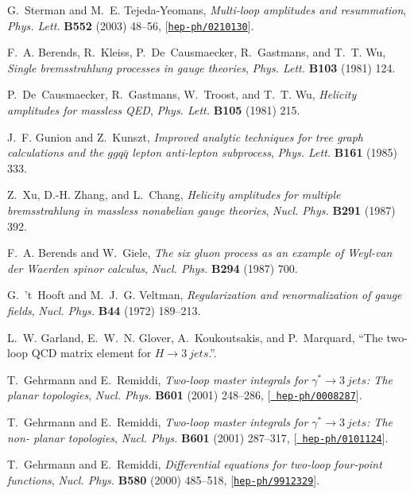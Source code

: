 \documentclass[paper,notoc,nohyper]{JHEP3}
\begin{document}
\begin{thebibliography}{10}
G.~Sterman and M.~E. Tejeda-Yeomans, {\it Multi-loop amplitudes and
  resummation},  {\em Phys. Lett.} {\bf B552} (2003) 48--56,
  [\href{http://xxx.lanl.gov/abs/hep-ph/0210130}{{\tt hep-ph/0210130}}].

F.~A. Berends, R.~Kleiss, P.~De~Causmaecker, R.~Gastmans, and T.~T. Wu, {\it
  Single bremsstrahlung processes in gauge theories},  {\em Phys. Lett.} {\bf
  B103} (1981) 124.

P.~De~Causmaecker, R.~Gastmans, W.~Troost, and T.~T. Wu, {\it Helicity
  amplitudes for massless {QED}},  {\em Phys. Lett.} {\bf B105} (1981) 215.

J.~F. Gunion and Z.~Kunszt, {\it Improved analytic techniques for tree graph
  calculations and the $g g q\bar{q}$ lepton anti-lepton subprocess},  {\em
  Phys. Lett.} {\bf B161} (1985) 333.

Z.~Xu, D.-H. Zhang, and L.~Chang, {\it Helicity amplitudes for multiple
  bremsstrahlung in massless nonabelian gauge theories},  {\em Nucl. Phys.}
  {\bf B291} (1987) 392.

F.~A. Berends and W.~Giele, {\it The six gluon process as an example of
  {W}eyl-van der {W}aerden spinor calculus},  {\em Nucl. Phys.} {\bf B294}
  (1987) 700.

G.~'t~Hooft and M.~J.~G. Veltman, {\it Regularization and renormalization of
  gauge fields},  {\em Nucl. Phys.} {\bf B44} (1972) 189--213.

L.~W. Garland, E.~W.~N. Glover, A.~Koukoutsakis, and P.~Marquard, ``The
  two-loop {QCD} matrix element for ${H} \rightarrow 3~jets$.''.

T.~Gehrmann and E.~Remiddi, {\it Two-loop master integrals for $\gamma^*
  \rightarrow 3 ~jets$: The planar topologies},  {\em Nucl. Phys.} {\bf B601}
  (2001) 248--286, [\href{http://xxx.lanl.gov/abs/hep-ph/0008287}{{\tt
  hep-ph/0008287}}].

T.~Gehrmann and E.~Remiddi, {\it Two-loop master integrals for $\gamma^*
  \rightarrow 3 ~jets$: The non- planar topologies},  {\em Nucl. Phys.} {\bf
  B601} (2001) 287--317, [\href{http://xxx.lanl.gov/abs/hep-ph/0101124}{{\tt
  hep-ph/0101124}}].

T.~Gehrmann and E.~Remiddi, {\it Differential equations for two-loop four-point
  functions},  {\em Nucl. Phys.} {\bf B580} (2000) 485--518,
  [\href{http://xxx.lanl.gov/abs/hep-ph/9912329}{{\tt hep-ph/9912329}}].


\end{thebibliography}
\end{document}
